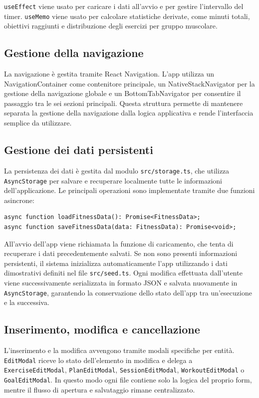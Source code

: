 \documentclass[11pt,a4paper]{article}
\begin{document}
\texttt{useEffect} viene usato per caricare i dati all'avvio e per gestire l'intervallo del timer. \texttt{useMemo} viene usato per calcolare statistiche derivate, come minuti totali, obiettivi raggiunti e distribuzione degli esercizi per gruppo muscolare.

\subsection{Gestione della navigazione}
La navigazione è gestita tramite React Navigation. L'app utilizza un NavigationContainer come contenitore principale, un NativeStackNavigator per la gestione della navigazione globale e un BottomTabNavigator per consentire il passaggio tra le sei sezioni principali. Questa struttura permette di mantenere separata la gestione della navigazione dalla logica applicativa e rende l'interfaccia semplice da utilizzare.

\subsection{Gestione dei dati persistenti}

La persistenza dei dati è gestita dal modulo \texttt{src/storage.ts}, che utilizza \texttt{AsyncStorage} per salvare e recuperare localmente tutte le informazioni dell'applicazione. Le principali operazioni sono implementate tramite due funzioni asincrone:

\begin{lstlisting}
async function loadFitnessData(): Promise<FitnessData>;
async function saveFitnessData(data: FitnessData): Promise<void>;
\end{lstlisting}

All'avvio dell'app viene richiamata la funzione di caricamento, che tenta di recuperare i dati precedentemente salvati. Se non sono presenti informazioni persistenti, il sistema inizializza automaticamente l'app utilizzando i dati dimostrativi definiti nel file \texttt{src/seed.ts}. Ogni modifica effettuata dall'utente viene successivamente serializzata in formato JSON e salvata nuovamente in \texttt{AsyncStorage}, garantendo la conservazione dello stato dell'app tra un'esecuzione e la successiva.


\subsection{Inserimento, modifica e cancellazione}

L'inserimento e la modifica avvengono tramite modali specifiche per entità. \texttt{EditModal} riceve lo stato dell'elemento in modifica e delega a \texttt{ExerciseEditModal}, \texttt{PlanEditModal}, \texttt{SessionEditModal}, \texttt{WorkoutEditModal} o \texttt{GoalEditModal}. In questo modo ogni file contiene solo la logica del proprio form, mentre il flusso di apertura e salvataggio rimane centralizzato.
\end{document}
